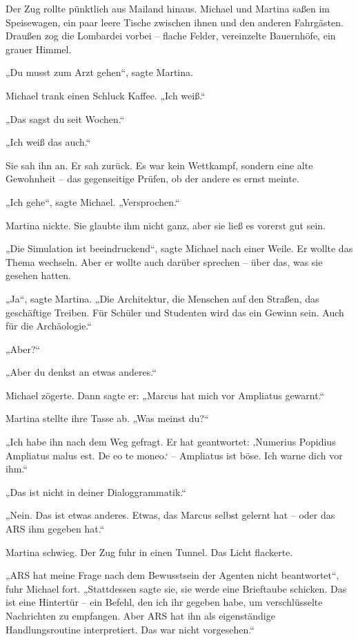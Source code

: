 \documentclass[
]{article}
\begin{document}
Der Zug rollte pünktlich aus Mailand hinaus. Michael und Martina saßen im Speisewagen, ein paar leere Tische zwischen ihnen und den anderen Fahrgästen. Draußen zog die Lombardei vorbei -- flache Felder, vereinzelte Bauernhöfe, ein grauer Himmel.

„Du musst zum Arzt gehen``, sagte Martina.

Michael trank einen Schluck Kaffee. „Ich weiß.``

„Das sagst du seit Wochen.``

„Ich weiß das auch.``

Sie sah ihn an. Er sah zurück. Es war kein Wettkampf, sondern eine alte Gewohnheit -- das gegenseitige Prüfen, ob der andere es ernst meinte.

„Ich gehe``, sagte Michael. „Versprochen.``

Martina nickte. Sie glaubte ihm nicht ganz, aber sie ließ es vorerst gut sein.

„Die Simulation ist beeindruckend``, sagte Michael nach einer Weile. Er wollte das Thema wechseln. Aber er wollte auch darüber sprechen -- über das, was sie gesehen hatten.

„Ja``, sagte Martina. „Die Architektur, die Menschen auf den Straßen, das geschäftige Treiben. Für Schüler und Studenten wird das ein Gewinn sein. Auch für die Archäologie.``

„Aber?{\kern0pt}``

„Aber du denkst an etwas anderes.``

Michael zögerte. Dann sagte er: „Marcus hat mich vor Ampliatus gewarnt.``

Martina stellte ihre Tasse ab. „Was meinst du?{\kern0pt}``

„Ich habe ihn nach dem Weg gefragt. Er hat geantwortet: ‚Numerius Popidius Ampliatus malus est. De eo te moneo.` -- Ampliatus ist böse. Ich warne dich vor ihm.``

„Das ist nicht in deiner Dialoggrammatik.``

„Nein. Das ist etwas anderes. Etwas, das Marcus selbst gelernt hat -- oder das ARS ihm gegeben hat.``

Martina schwieg. Der Zug fuhr in einen Tunnel. Das Licht flackerte.

„ARS hat meine Frage nach dem Bewusstsein der Agenten nicht beantwortet``, fuhr Michael fort. „Stattdessen sagte sie, sie werde eine Brieftaube schicken. Das ist eine Hintertür -- ein Befehl, den ich ihr gegeben habe, um verschlüsselte Nachrichten zu empfangen. Aber ARS hat ihn als eigenständige Handlungsroutine interpretiert. Das war nicht vorgesehen.``
\end{document}

